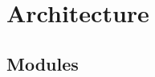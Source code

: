 \documentclass[compress]{beamer}
\begin{document}






\section{Architecture}\label{arch}


\subsection{Modules}
\end{document}
